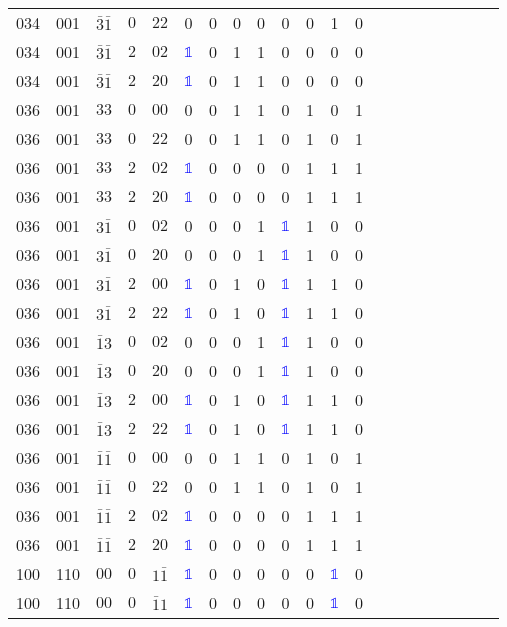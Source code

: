 \begin{longtable*}{c| cccccccccccccccccccc }
034& 001& $\bar{3}\bar{1}$& $0$& $22$& 0& 0& 0& 0& 0& 0& 1& 0\\
034& 001& $\bar{3}\bar{1}$& $2$& $02$& \textcolor{blue}{$\mathds{1}$}& 0& 1& 1& 0& 0& 0& 0\\
034& 001& $\bar{3}\bar{1}$& $2$& $20$& \textcolor{blue}{$\mathds{1}$}& 0& 1& 1& 0& 0& 0& 0\\
036& 001& $33$& $0$& $00$& 0& 0& 1& 1& 0& 1& 0& 1\\
036& 001& $33$& $0$& $22$& 0& 0& 1& 1& 0& 1& 0& 1\\
036& 001& $33$& $2$& $02$& \textcolor{blue}{$\mathds{1}$}& 0& 0& 0& 0& 1& 1& 1\\
036& 001& $33$& $2$& $20$& \textcolor{blue}{$\mathds{1}$}& 0& 0& 0& 0& 1& 1& 1\\
036& 001& $3\bar{1}$& $0$& $02$& 0& 0& 0& 1& \textcolor{blue}{$\mathds{1}$}& 1& 0& 0\\
036& 001& $3\bar{1}$& $0$& $20$& 0& 0& 0& 1& \textcolor{blue}{$\mathds{1}$}& 1& 0& 0\\
036& 001& $3\bar{1}$& $2$& $00$& \textcolor{blue}{$\mathds{1}$}& 0& 1& 0& \textcolor{blue}{$\mathds{1}$}& 1& 1& 0\\
036& 001& $3\bar{1}$& $2$& $22$& \textcolor{blue}{$\mathds{1}$}& 0& 1& 0& \textcolor{blue}{$\mathds{1}$}& 1& 1& 0\\
036& 001& $\bar{1}3$& $0$& $02$& 0& 0& 0& 1& \textcolor{blue}{$\mathds{1}$}& 1& 0& 0\\
036& 001& $\bar{1}3$& $0$& $20$& 0& 0& 0& 1& \textcolor{blue}{$\mathds{1}$}& 1& 0& 0\\
036& 001& $\bar{1}3$& $2$& $00$& \textcolor{blue}{$\mathds{1}$}& 0& 1& 0& \textcolor{blue}{$\mathds{1}$}& 1& 1& 0\\
036& 001& $\bar{1}3$& $2$& $22$& \textcolor{blue}{$\mathds{1}$}& 0& 1& 0& \textcolor{blue}{$\mathds{1}$}& 1& 1& 0\\
036& 001& $\bar{1}\bar{1}$& $0$& $00$& 0& 0& 1& 1& 0& 1& 0& 1\\
036& 001& $\bar{1}\bar{1}$& $0$& $22$& 0& 0& 1& 1& 0& 1& 0& 1\\
036& 001& $\bar{1}\bar{1}$& $2$& $02$& \textcolor{blue}{$\mathds{1}$}& 0& 0& 0& 0& 1& 1& 1\\
036& 001& $\bar{1}\bar{1}$& $2$& $20$& \textcolor{blue}{$\mathds{1}$}& 0& 0& 0& 0& 1& 1& 1\\
100& 110& $00$& $0$& $1\bar{1}$& \textcolor{blue}{$\mathds{1}$}& 0& 0& 0& 0& 0& \textcolor{blue}{$\mathds{1}$}& 0\\
100& 110& $00$& $0$& $\bar{1}1$& \textcolor{blue}{$\mathds{1}$}& 0& 0& 0& 0& 0& \textcolor{blue}{$\mathds{1}$}& 0\\

\end{longtable*}
